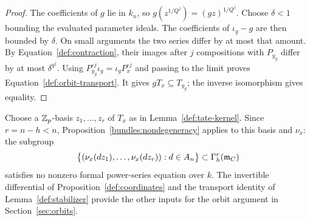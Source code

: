 \begin{proof}
The coefficients of $g$ lie in $k_n$, so
$g(z^{1/Q^j})=(gz)^{1/Q^j}$.  Choose $\delta<1$ bounding the evaluated
parameter ideals.  The coefficients of $\iota_g-g$ are then bounded by
$\delta$.  On small arguments the two series differ by at most that
amount.  By Equation~\eqref{def:contraction}, their images after $j$
compositions with $P_{y_g}$ differ by at most $\delta^{q^j}$.
Using $P_{y_g}^{\circ j}\iota_g=\iota_g P_x^{\circ j}$ and passing to
the limit proves Equation~\eqref{def:orbit-transport}.  It gives
$gT_x\subseteq T_{y_g}$; the inverse isomorphism gives equality.
\end{proof}

Choose a $\mathbb Z_p$-basis $z_1,\ldots,z_r$ of $T_x$ as in
Lemma~\ref{def:tate-kernel}.  Since $r=n-h<n$,
Proposition~\ref{bundles:nondegeneracy} applies to this basis and $\nu_x$:
the subgroup
\[
 \bigl\{(\nu_x(dz_1),\ldots,\nu_x(dz_r)):d\in A_n\bigr\}
       \subset\Gamma_h^r(\mathfrak m_C)
\]
satisfies no nonzero formal power-series equation over $k$.
The invertible differential of Proposition~\ref{def:coordinates} and
the transport identity of Lemma~\ref{def:stabilizer} provide the other
inputs for the orbit argument in Section~\ref{sec:orbits}.
